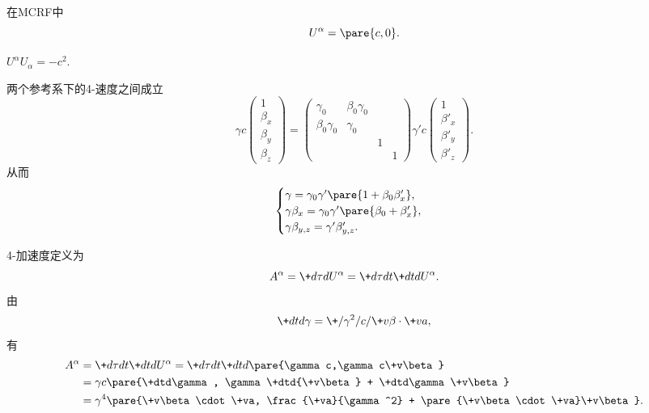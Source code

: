 \documentclass[hidelinks]{ctexart}
\begin{document}
\begin{cenum}
    \item 在MCRF中
    \[ U^\alpha = \pare{c,0}. \]
    \item $U^\alpha U_\alpha = -c^2$.
    \item 两个参考系下的4-速度之间成立
    \[ \gamma c \begin{pmatrix}
        1 \\ \beta_x \\ \beta_y \\ \beta_z
    \end{pmatrix} = \begin{pmatrix}
        \gamma_0 & \beta_0 \gamma_0 & & \\
        \beta_0 \gamma_0 & \gamma_0 & & \\
        & & 1 & \\
        & & & 1
    \end{pmatrix} \gamma'c \begin{pmatrix}
        1 \\ \beta'_x \\ \beta'_y \\ \beta'_z
    \end{pmatrix}. \]
    从而
    \[ \begin{cases}
        \gamma = \gamma_0 \gamma'\pare{1+\beta_0 \beta'_x}, \\
        \gamma \beta_x = \gamma_0 \gamma'\pare{\beta_0 + \beta'_x}, \\
        \gamma \beta_{y,z} = \gamma'\beta'_{y,z}.
    \end{cases} \]
\end{cenum}
4-加速度定义为
\[ A^\alpha = \+d{\tau}d{U^\alpha} = \+d\tau d{t} \+dtd{U^\alpha}. \]
由
\[ \+dtd\gamma = \+/\gamma^2/c/ \+v\beta \cdot \+va, \]
有
\begin{align*}
    A^\alpha &= \+d\tau dt \+dtd{U^\alpha} = \+d\tau dt \+dtd{} \pare{\gamma c,\gamma c\+v\beta} \\
    &= \gamma c\pare{\+dtd\gamma, \gamma\+dtd{\+v\beta} + \+dtd\gamma \+v\beta} \\
    &= \gamma^4 \pare{\+v\beta\cdot \+va, \frac{\+va}{\gamma^2} + \pare{\+v\beta\cdot \+va}\+v\beta}.
\end{align*}
\end{document}
